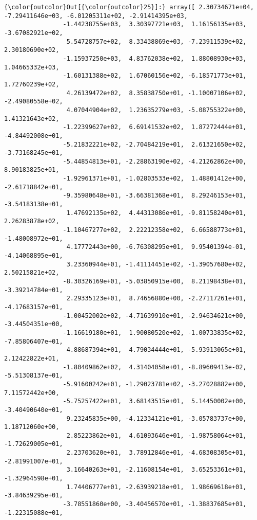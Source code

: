 \documentclass[11pt]{article}
\begin{document}
\begin{Verbatim}[commandchars=\\\{\}]
{\color{outcolor}Out[{\color{outcolor}25}]:} array([ 2.30734671e+04, -7.29411646e+03, -6.01205311e+02, -2.91414395e+03,
                -1.44238755e+03,  3.30397721e+03,  1.16156135e+03, -3.67082921e+02,
                 5.54728757e+02,  8.33438869e+03, -7.23911539e+02,  2.30180690e+02,
                -1.15937250e+03,  4.83762038e+02,  1.88008930e+03,  1.04665332e+03,
                -1.60131388e+02,  1.67060156e+02, -6.18571773e+01,  1.72760239e+02,
                 4.26139472e+02,  8.35838750e+01, -1.10007106e+02, -2.49080558e+02,
                 4.07044904e+02,  1.23635279e+03, -5.08755322e+00,  1.41321643e+02,
                -1.22399627e+02,  6.69141532e+02,  1.87272444e+01, -4.84492008e+01,
                -5.21832221e+02, -2.70484219e+01,  2.61321650e+02, -3.73168245e+01,
                -5.44854813e+01, -2.28863190e+02, -4.21262862e+00,  8.90183825e+01,
                -1.92961371e+01, -1.02803533e+02,  1.48801412e+00, -2.61718842e+01,
                -9.35980648e+01, -3.66381368e+01,  8.29246153e+01, -3.54183138e+01,
                 1.47692135e+02,  4.44313086e+01, -9.81158240e+01,  2.26283878e+02,
                -1.10467277e+02,  2.22212358e+02,  6.66588773e+01, -1.48008972e+01,
                 4.17772443e+00, -6.76308295e+01,  9.95401394e-01, -4.14068895e+01,
                 3.23360944e+01, -1.41114451e+02, -1.39057680e+02,  2.50215821e+02,
                -8.30326169e+01, -5.03850915e+00,  8.21198438e+01, -3.39214784e+01,
                 2.29335123e+01,  8.74656880e+00, -2.27117261e+01, -4.17683157e+01,
                -1.00452002e+02, -4.71639910e+01, -2.94634621e+00, -3.44504351e+00,
                -1.16619180e+01,  1.90080520e+02, -1.00733835e+02, -7.85806407e+01,
                 4.88687394e+01,  4.79034444e+01, -5.93913065e+01,  2.12422822e+01,
                -1.80409862e+02,  4.31404058e+01, -8.89609413e-02, -5.51308137e+01,
                -5.91600242e+01, -1.29023781e+02, -3.27028882e+00,  7.11572442e+00,
                -5.75257422e+01,  3.68143515e+01,  5.14450002e+00, -3.40490640e+01,
                 9.23245835e+00, -4.12334121e+01, -3.05783737e+00,  1.18712060e+00,
                 2.85223862e+01,  4.61093646e+01, -1.98758064e+01, -1.72629005e+01,
                 2.23703620e+01,  3.78912846e+01, -4.68308305e+01, -2.81991007e+01,
                 3.16640263e+01, -2.11608154e+01,  3.65253361e+01, -1.32964598e+01,
                 1.74406777e+01, -2.63939218e+01,  1.98669618e+01, -3.84639295e+01,
                -3.78551860e+00, -3.40456570e+01, -1.38837685e+01, -1.22315088e+01,

\end{Verbatim}
\end{document}
